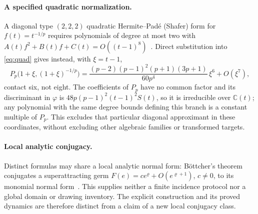 \paragraph{A specified quadratic normalization.}
A diagonal type $(2,2,2)$ quadratic Hermite--Pad\'e (Shafer) form for $f(t)=t^{-1/p}$ requires
polynomials of degree at most two with $A(t)f^{2}+B(t)f+C(t)=O((t-1)^{8})$~\cite[eqs.~(1.4)--(1.6)]{cabay}.
Direct substitution into \eqref{eq:quad} gives instead, with $\xi=t-1$,
\[ P_p\bigl(1+\xi,(1+\xi)^{-1/p}\bigr)=\frac{(p-2)(p-1)^{2}(p+1)(3p+1)}{60p^{4}}\,\xi^{6}+O(\xi^{7}), \]
contact six, not eight. The coefficients of $P_p$ have no common factor and its discriminant in
$\varphi$ is $48p(p-1)^{2}(t-1)^{2}S(t)$, so it is irreducible over $\mathbb{C}(t)$; any polynomial
with the same degree bounds defining this branch is a constant multiple of $P_p$. This excludes that
particular diagonal approximant in these coordinates, without excluding other algebraic families or
transformed targets.

\paragraph{Local analytic conjugacy.}
Distinct formulas may share a local analytic normal form: B\"ottcher's theorem conjugates a
superattracting germ $F(e)=ce^{\varrho}+O(e^{\varrho+1})$, $c\neq0$, to its monomial normal form~\cite{buff}. This
supplies neither a finite incidence protocol nor a global domain or drawing inventory. The explicit
construction and its proved dynamics are therefore distinct from a claim of a new local conjugacy class.

